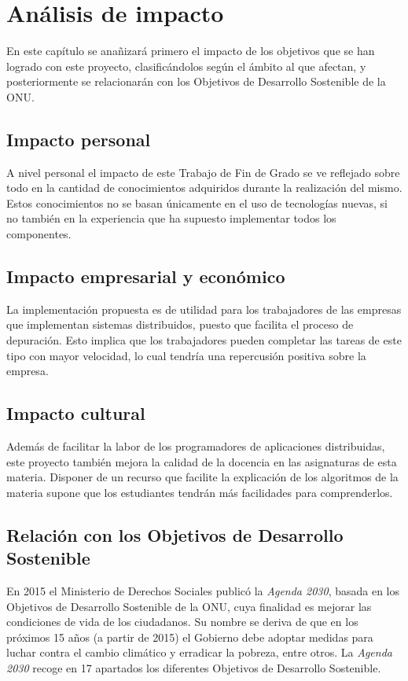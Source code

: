 \chapter{Análisis de impacto}

En este capítulo se anañizará primero el impacto de los objetivos que se han logrado con este proyecto, clasificándolos según el ámbito al que afectan, y posteriormente se relacionarán con los Objetivos de Desarrollo Sostenible de la ONU.

\section{Impacto personal}

A nivel personal el impacto de este Trabajo de Fin de Grado se ve reflejado sobre todo en la cantidad de conocimientos adquiridos durante la realización del mismo. Estos conocimientos no se basan únicamente en el uso de tecnologías nuevas, si no también en la experiencia que ha supuesto implementar todos los componentes.

\section{Impacto empresarial y económico}

La implementación propuesta es de utilidad para los trabajadores de las empresas que implementan sistemas distribuidos, puesto que facilita el proceso de depuración. Esto implica que los trabajadores pueden completar las tareas de este tipo con mayor velocidad, lo cual tendría una repercusión positiva sobre la empresa.

\section{Impacto cultural}
Además de facilitar la labor de los programadores de aplicaciones distribuidas, este proyecto también mejora la calidad de la docencia en las asignaturas de esta materia. Disponer de un recurso que facilite la explicación de los algoritmos de la materia supone que los estudiantes tendrán más facilidades para comprenderlos.

\section{Relación con los Objetivos de Desarrollo Sostenible}

En 2015 el Ministerio de Derechos Sociales publicó la \textit{Agenda 2030}, basada en los Objetivos de Desarrollo Sostenible de la ONU, cuya finalidad es mejorar las condiciones de vida de los ciudadanos. Su nombre se deriva de que en los próximos 15 años (a partir de 2015) el Gobierno debe adoptar medidas para luchar contra el cambio climático y erradicar la pobreza, entre otros. La \textit{Agenda 2030} recoge en 17 apartados los diferentes Objetivos de Desarrollo Sostenible. 

